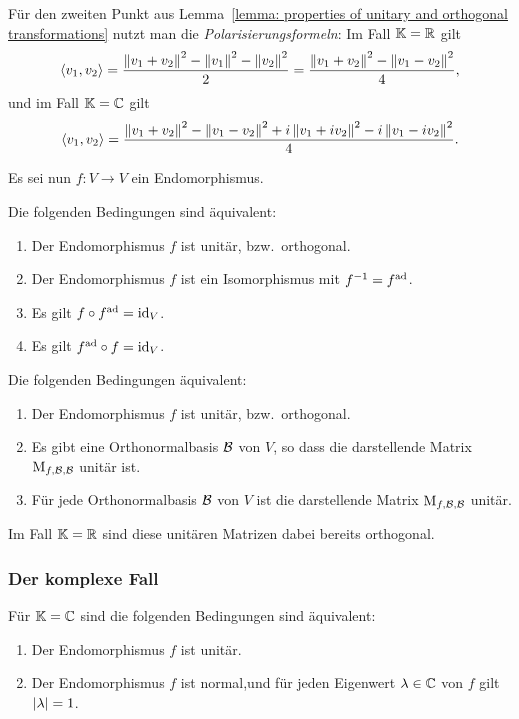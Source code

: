 Für den zweiten Punkt aus Lemma~\ref{lemma: properties of unitary and orthogonal transformations} nutzt man die \emph{Polarisierungsformeln}:
Im Fall $\mathbb{K} = \mathbb{R}$ gilt
\[
    \left\langle v_1, v_2 \right\rangle
  = \frac{ \left\| v_1 + v_2 \right\|^2 - \left\| v_1 \right\|^2 - \left\| v_2 \right\|^2 }{2}
  = \frac{ \left\| v_1 + v_2 \right\|^2 - \left\| v_1 - v_2 \right\|^2 }{4},
\]
und im Fall $\mathbb{K} = \mathbb{C}$ gilt
\[
    \left\langle v_1, v_2 \right\rangle
  = \frac{ \left\| v_1 + v_2 \right\|^2 - \left\| v_1 - v_2 \right\|^2 + i \left\| v_1 + i v_2 \right\|^2 - i \left\| v_1 - i v_2 \right\|^2 }{4}.
\]

Es sei nun $f \colon V \to V$ ein Endomorphismus.

\begin{lemma}
  Die folgenden Bedingungen sind äquivalent:
  \begin{enumerate}
    \item
      Der Endomorphismus $f$ ist unitär, bzw.\ orthogonal.
    \item
      Der Endomorphismus $f$ ist ein Isomorphismus mit $f^{-1} = f^{\operatorname{ad}}$.
    \item
      Es gilt $f \circ f^{\operatorname{ad}} = \operatorname{id}_V$.
    \item
      Es gilt $f^{\operatorname{ad}} \circ f = \operatorname{id}_V$.
  \end{enumerate}
\end{lemma}

\begin{lemma}
  Die folgenden Bedingungen äquivalent:
  \begin{enumerate}
    \item
      Der Endomorphismus $f$ ist unitär, bzw.\ orthogonal.
    \item
      Es gibt eine Orthonormalbasis $\mathcal{B}$ von $V$, so dass die darstellende Matrix $\operatorname{M}_{f, \mathcal{B}, \mathcal{B}}$ unitär ist.
    \item
      Für jede Orthonormalbasis $\mathcal{B}$ von $V$ ist die darstellende Matrix $\operatorname{M}_{f, \mathcal{B}, \mathcal{B}}$ unitär.
  \end{enumerate}
  Im Fall $\mathbb{K} = \mathbb{R}$ sind diese unitären Matrizen dabei bereits orthogonal.
\end{lemma}



\subsubsection{Der komplexe Fall}

\begin{theorem}
  Für $\mathbb{K} = \mathbb{C}$ sind die folgenden Bedingungen sind äquivalent:
  \begin{enumerate}
    \item
      Der Endomorphismus $f$ ist unitär.
    \item
      Der Endomorphismus $f$ ist normal,und für jeden Eigenwert $\lambda \in \mathbb{C}$ von $f$ gilt $\left| \lambda \right| = 1$.
  \end{enumerate}
\end{theorem}

